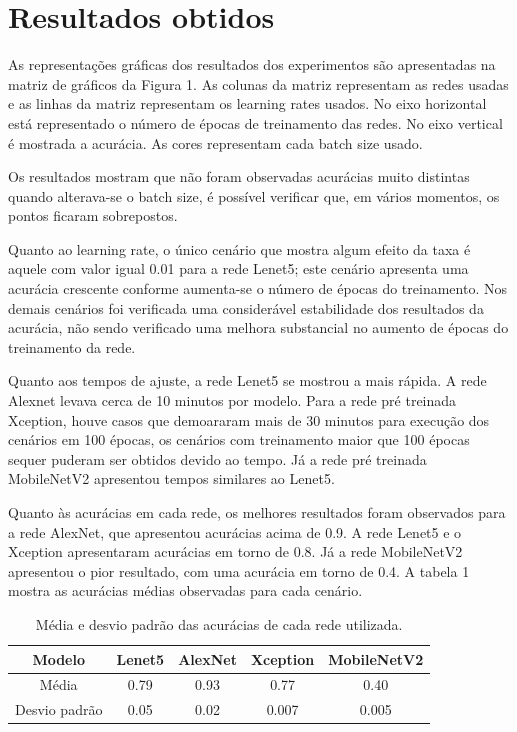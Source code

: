 \documentclass[
	12pt,				%
	openright,			%
	twoside,			%
	a4paper,			%
	english,			%
	brazil,				%
	svgnames
	]{abntex2}\usepackage[]{graphicx}\usepackage[]{color}
\begin{document}
\chapter{Resultados obtidos}
\label{cap:resultados}


As representações gráficas dos resultados dos experimentos são apresentadas na matriz de gráficos da Figura 1. As colunas da matriz representam as redes usadas e as linhas da matriz representam os learning rates usados. No eixo horizontal está representado o número de épocas de treinamento das redes. No eixo vertical é mostrada a acurácia. As cores representam cada batch size usado. 

Os resultados mostram que não foram observadas acurácias muito distintas quando alterava-se o batch size, é possível verificar que, em vários momentos, os pontos ficaram sobrepostos.

Quanto ao learning rate, o único cenário que mostra algum efeito da taxa é aquele com valor igual 0.01 para a rede Lenet5; este cenário apresenta uma acurácia crescente conforme aumenta-se o número de épocas do treinamento. Nos demais cenários foi verificada uma considerável estabilidade dos resultados da acurácia, não sendo verificado uma melhora substancial no aumento de épocas do treinamento da rede.

Quanto aos tempos de ajuste, a rede Lenet5 se mostrou a mais rápida. A rede Alexnet levava cerca de 10 minutos por modelo. Para a rede pré treinada Xception, houve casos que demoararam mais de 30 minutos para execução dos cenários em 100 épocas, os cenários com treinamento maior que 100 épocas sequer puderam ser obtidos devido ao tempo. Já a rede pré treinada MobileNetV2 apresentou tempos similares ao Lenet5.

Quanto às acurácias em cada rede, os melhores resultados foram observados para a rede AlexNet, que apresentou acurácias acima de 0.9. A rede Lenet5 e o Xception apresentaram acurácias em torno de 0.8. Já a rede MobileNetV2 apresentou o pior resultado, com uma acurácia em torno de 0.4. A tabela 1 mostra as acurácias médias observadas para cada cenário. 

\begin{table}[h]
\centering
\begin{tabular}{c|cccc}
\hline
Modelo        & Lenet5 & AlexNet & Xception & MobileNetV2 \\ \hline
Média         & 0.79   & 0.93    & 0.77     & 0.40        \\
Desvio padrão & 0.05   & 0.02    & 0.007    & 0.005       \\ \hline
\end{tabular}
\caption{Média e desvio padrão das acurácias de cada rede utilizada.}
\label{tab:my-table}
\end{table}
\end{document}
